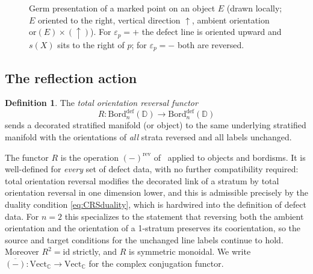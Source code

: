 \documentclass[11pt]{article}
\theoremstyle{definition}
\newtheorem{definition}[theorem]{Definition}
\newcommand{\bC}{\mathbb{C}}
\newcommand{\bD}{\mathbb{D}}
\newcommand{\Bord}{\mathrm{Bord}}
\newcommand{\Vect}{\mathrm{Vect}}
\begin{document}
\begin{figure}[ht]
\centering
{}
\hspace{1.8cm}
\caption{Germ presentation of a marked point on an object $E$ (drawn locally; $E$ oriented to the right, vertical direction $\uparrow$, ambient orientation $\mathrm{or}(E) \times (\uparrow)$). For $\varepsilon_p = +$ the defect line is oriented upward and $s(X)$ sits to the right of $p$; for $\varepsilon_p = -$ both are reversed.}
\label{fig:conventions}
\end{figure}

\subsection{The reflection action}
\label{sec:involutivedata}

\begin{definition}
\label{def:reflectionfunctor}
The \emph{total orientation reversal functor}
\begin{equation}
  R \colon \Bord_n^{\textrm{def}}(\bD) \longrightarrow \Bord_n^{\textrm{def}}(\bD)
\end{equation}
sends a decorated stratified manifold (or object) to the same underlying stratified manifold with the orientations of \emph{all} strata reversed and all labels unchanged.
\end{definition}

The functor $R$ is the operation $(-)^{\mathrm{rev}}$ of~\cite{CRS18} applied to objects and bordisms. It is well-defined for \emph{every} set of defect data, with no further compatibility required: total orientation reversal modifies the decorated link of a stratum by total orientation reversal in one dimension lower, and this is admissible precisely by the duality condition \eqref{eq:CRSduality}, which is hardwired into the definition of defect data. For $n = 2$ this specializes to the statement that reversing both the ambient orientation and the orientation of a 1-stratum preserves its coorientation, so the source and target conditions for the unchanged line labels continue to hold. Moreover $R^2 = \mathrm{id}$ strictly, and $R$ is symmetric monoidal. We write $\overline{(-)} \colon \Vect_\bC \to \Vect_\bC$ for the complex conjugation functor.
\end{document}
